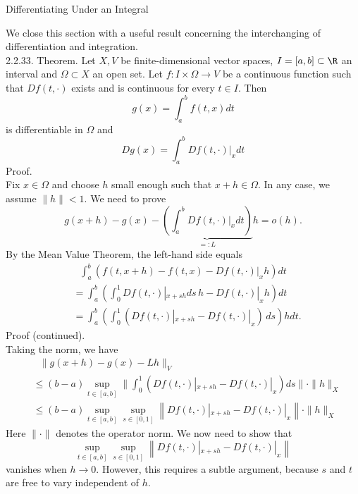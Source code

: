 \documentclass[smaller,hyperref={CJKbookmarks=true}]{beamer}
\begin{document}
\begin{frame}{Dif{}ferentiating
Under an Integral}
\begin{spacing}{1.05}
We close this section with a useful result concerning the interchanging of
dif{}ferentiation and integration.\\[6pt]
\alert{2.2.33. Theorem.} Let $X,V$ be finite-dimensional vector spaces, $I=[a,b]\subset\R$ an interval and $\Omega\subset X$ an open set. Let $f:I\times\Omega\to V$ be a continuous function such that $Df(t,\cdot)$ exists and is continuous for every $t\in I$. Then
\[g(x)=\int_{a}^{b}f(t,x)dt\]
is dif{}ferentiable in $\Omega$ and
\[Dg(x)=\int_{a}^{b}Df(t,\cdot)|_xdt\]
\newpage
\alert{Proof.}\\
Fix $x\in\Omega$ and choose $h$ small enough such that $x+h\in\Omega$. In any case, we assume $\|h\|<1$. We need to prove
\begin{equation}\label{2.2.7}
  g(x+h)-g(x)-\underbrace{\left(\int_{a}^{b}Df(t,\cdot)|_xdt
  \right)}_{=:L}h=o(h).
\end{equation}
By the Mean Value Theorem, the left-hand side equals
\begin{equation*}
  \begin{split}
       &~~~\int_{a}^{b}\left(f(t,x+h)-f(t,x)-Df(t,\cdot)|_xh\right)dt  \\
       &=\int_{a}^{b}\left(\int_{0}^{1}Df(t,\cdot)|_{x+sh}ds\,h-Df(t,\cdot)|_xh\right)dt \\
       &=\int_{a}^{b}\left(\int_{0}^{1}\left(Df(t,\cdot)|_{x+sh}-Df(t,\cdot)|_x\right)\,ds\right)hdt.
  \end{split}
\end{equation*}
\newpage
\alert{Proof (continued).}\\
Taking the norm, we have
\begin{equation*}
  \begin{split}
       &~~~\|g(x+h)-g(x)-Lh\|_V  \\
       &\leq(b-a)\sup\limits_{t\in[a,b]}\bigg\|\int_{0}^{1}\left(Df(t,\cdot)|_{x+sh}-Df(t,\cdot)|_x\right)ds\bigg\|\cdot\|h\|_X  \\
       &\leq(b-a)\sup\limits_{t\in[a,b]}\sup\limits_{s\in[0,1]}\left\|Df(t,\cdot)|_{x+sh}-Df(t,\cdot)|_x\right\|\cdot\|h\|_X
  \end{split}
\end{equation*}
Here $\|\cdot\|$ denotes the operator norm. We now need to show that
\[\sup_{t\in[a,b]}\sup_{s\in[0,1]}\left\|Df(t,\cdot)|_{x+sh}-Df(t,\cdot)|_x\right\|\]
vanishes when $h\to0$. However, this requires a subtle argument, because $s$ and $t$ are free to vary independent of $h$.

\end{spacing}
\end{frame}
\end{document}
